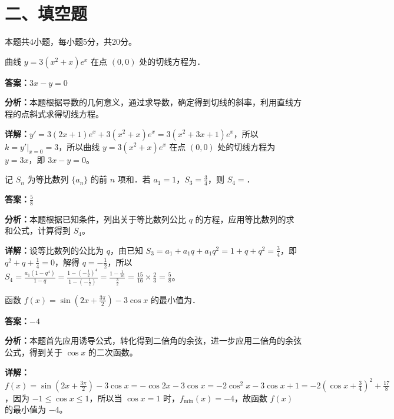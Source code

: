 \section*{二、填空题}
本题共4小题，每小题5分，共20分。

\begin{question}[points=5]
曲线 $y = 3(x^2+x)e^x$ 在点 $(0,0)$ 处的切线方程为．
\fillin[{$3x - y = 0$}]
\begin{solution}
\textbf{答案：}$3x - y = 0$

\textbf{分析：}本题根据导数的几何意义，通过求导数，确定得到切线的斜率，利用直线方程的点斜式求得切线方程。

\textbf{详解：}$y' = 3(2x+1)e^x + 3(x^2+x)e^x = 3(x^2+3x+1)e^x$，所以 $k = y'|_{x=0} = 3$，所以曲线 $y = 3(x^2+x)e^x$ 在点 $(0,0)$ 处的切线方程为 $y = 3x$，即 $3x - y = 0$。
\end{solution}
\end{question}

\begin{question}[points=5]
记 $S_n$ 为等比数列 $\{a_n\}$ 的前 $n$ 项和．若 $a_1 = 1$，$S_3 = \frac{3}{4}$，则 $S_4 =$．
\fillin[{$\frac{5}{8}$}]
\begin{solution}
\textbf{答案：}$\frac{5}{8}$

\textbf{分析：}本题根据已知条件，列出关于等比数列公比 $q$ 的方程，应用等比数列的求和公式，计算得到 $S_4$。

\textbf{详解：}设等比数列的公比为 $q$，由已知 $S_3 = a_1 + a_1q + a_1q^2 = 1+q+q^2 = \frac{3}{4}$，即 $q^2+q+\frac{1}{4}=0$，解得 $q = -\frac{1}{2}$，所以 $S_4 = \frac{a_1(1-q^4)}{1-q} = \frac{1-(-\frac{1}{2})^4}{1-(-\frac{1}{2})} = \frac{1-\frac{1}{16}}{\frac{3}{2}} = \frac{15}{16} \times \frac{2}{3} = \frac{5}{8}$。
\end{solution}
\end{question}

\begin{question}[points=5]
函数 $f(x) = \sin(2x+\frac{3\pi}{2}) - 3\cos x$ 的最小值为．
\fillin[{$-4$}]
\begin{solution}
\textbf{答案：}$-4$

\textbf{分析：}本题首先应用诱导公式，转化得到二倍角的余弦，进一步应用二倍角的余弦公式，得到关于 $\cos x$ 的二次函数。

\textbf{详解：}$f(x) = \sin(2x+\frac{3\pi}{2}) - 3\cos x = -\cos 2x - 3\cos x = -2\cos^2 x - 3\cos x + 1 = -2(\cos x + \frac{3}{4})^2 + \frac{17}{8}$，因为 $-1 \le \cos x \le 1$，所以当 $\cos x = 1$ 时，$f_{\min}(x) = -4$，故函数 $f(x)$ 的最小值为 $-4$。
\end{solution}
\end{question}

